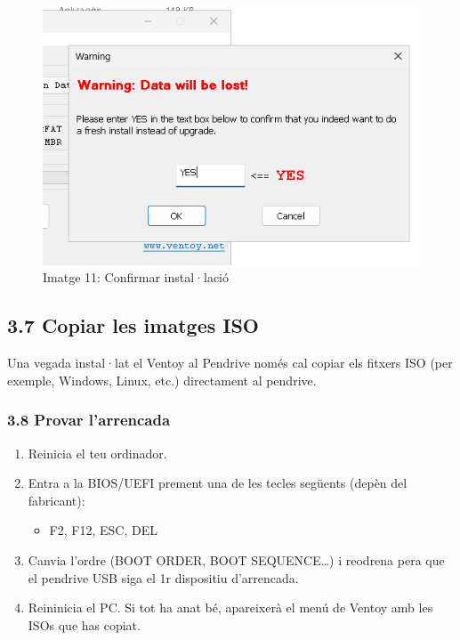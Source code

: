\documentclass[
  12 pt,
  a4paper,
]{article}
\providecommand{\tightlist}{%
  \setlength{\itemsep}{0pt}\setlength{\parskip}{0pt}}
\begin{document}
\begin{figure}
\centering
\includegraphics{png/executar3.png}
\caption{Imatge 11: Confirmar instal·lació}
\end{figure}

\subsection{3.7 Copiar les imatges ISO}\label{copiar-les-imatges-iso}

Una vegada instal·lat el Ventoy al Pendrive només cal copiar els fitxers
ISO (per exemple, Windows, Linux, etc.) directament al pendrive.

\subsubsection{3.8 Provar l'arrencada}\label{provar-larrencada}

\begin{enumerate}
\def\labelenumi{\arabic{enumi}.}
\tightlist
\item
  Reinicia el teu ordinador.\\
\item
  Entra a la BIOS/UEFI prement una de les tecles següents (depèn del
  fabricant):

  \begin{itemize}
  \tightlist
  \item
    F2, F12, ESC, DEL\\
  \end{itemize}
\item
  Canvia l'ordre (BOOT ORDER, BOOT SEQUENCE\ldots) i reodrena pera que
  el pendrive USB siga el 1r dispositiu d'arrencada.
\item
  Reininicia el PC. Si tot ha anat bé, apareixerà el menú de Ventoy amb
  les ISOs que has copiat.
\end{enumerate}
\end{document}
